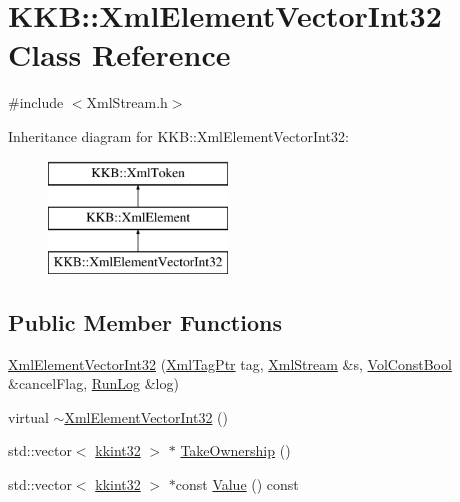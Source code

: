 \hypertarget{class_k_k_b_1_1_xml_element_vector_int32}{}\section{K\+KB\+:\+:Xml\+Element\+Vector\+Int32 Class Reference}
\label{class_k_k_b_1_1_xml_element_vector_int32}


{\ttfamily \#include $<$Xml\+Stream.\+h$>$}

Inheritance diagram for K\+KB\+:\+:Xml\+Element\+Vector\+Int32\+:\begin{figure}[H]
\begin{center}
\leavevmode
\includegraphics[height=3.000000cm]{class_k_k_b_1_1_xml_element_vector_int32}
\end{center}
\end{figure}
\subsection*{Public Member Functions}
\begin{DoxyCompactItemize}
\item 
\hyperlink{class_k_k_b_1_1_xml_element_vector_int32_a05ae676a9d874997a66077b5c7b98664}{Xml\+Element\+Vector\+Int32} (\hyperlink{namespace_k_k_b_a9253a3ea8a5da18ca82be4ca2b390ef0}{Xml\+Tag\+Ptr} tag, \hyperlink{class_k_k_b_1_1_xml_stream}{Xml\+Stream} \&s, \hyperlink{namespace_k_k_b_a7d390f568e2831fb76b86b56c87bf92f}{Vol\+Const\+Bool} \&cancel\+Flag, \hyperlink{class_k_k_b_1_1_run_log}{Run\+Log} \&log)
\item 
virtual \hyperlink{class_k_k_b_1_1_xml_element_vector_int32_a03001c482bffdf9a0c621a9b84d12284}{$\sim$\+Xml\+Element\+Vector\+Int32} ()
\item 
std\+::vector$<$ \hyperlink{namespace_k_k_b_a8fa4952cc84fda1de4bec1fbdd8d5b1b}{kkint32} $>$ $\ast$ \hyperlink{class_k_k_b_1_1_xml_element_vector_int32_a22c74bbacae4574d79480e21859ba49f}{Take\+Ownership} ()
\item 
std\+::vector$<$ \hyperlink{namespace_k_k_b_a8fa4952cc84fda1de4bec1fbdd8d5b1b}{kkint32} $>$ $\ast$const \hyperlink{class_k_k_b_1_1_xml_element_vector_int32_ab2877c6bbf603155fc89cb974bc02883}{Value} () const 
\end{DoxyCompactItemize}
